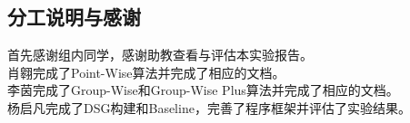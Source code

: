 \documentclass{article}
\begin{document}
\begin{CJK}{UTF8}{gbsn}
\section{分工说明与感谢}
首先感谢组内同学，感谢助教查看与评估本实验报告。\\
肖翱完成了Point-Wise算法并完成了相应的文档。\\
李茵完成了Group-Wise和Group-Wise Plus算法并完成了相应的文档。\\
杨启凡完成了DSG构建和Baseline，完善了程序框架并评估了实验结果。\\
\end{CJK}
\end{document}
